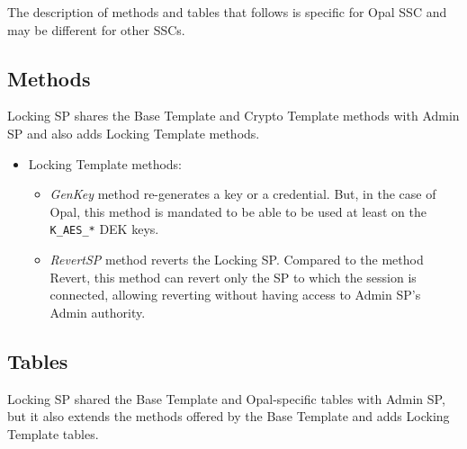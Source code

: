 The description of methods and tables that follows is specific for Opal SSC and may be different for other SSCs.




\subsection{Methods}

Locking SP shares the Base Template and Crypto Template methods with Admin SP and also adds Locking Template methods.


\begin{itemize}
\item Locking Template methods:
\begin{itemize}
\item \emph{GenKey} method re-generates a key or a credential. But, in the case of Opal, this method is mandated to be able to be used at least on the \verb|K_AES_*| DEK keys.
\item \emph{RevertSP} method reverts the Locking SP. Compared to the method Revert, this method can revert only the SP to which the session is connected, allowing reverting without having access to Admin SP's Admin authority.
\end{itemize}
\end{itemize}

\subsection{Tables}
\label{locking_sp_tables}

Locking SP shared the Base Template and Opal-specific tables with Admin SP, but it also extends the methods offered by the Base Template and adds Locking Template tables.


